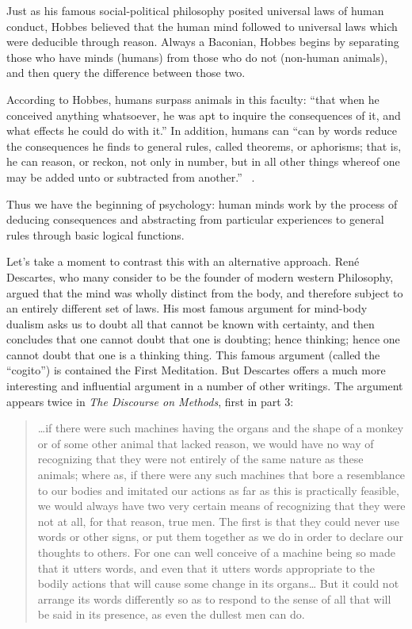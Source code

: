 \begin{refsection}
Just as his famous social-political philosophy posited universal laws of human conduct, Hobbes believed that the human mind followed to universal laws which were deducible through reason. Always a Baconian, Hobbes begins by separating those who have minds (humans) from those who do not (non-human animals), and then query the difference between those two.

According to Hobbes, humans surpass animals in this faculty: “that when he conceived anything whatsoever, he was apt to inquire the consequences of it, and what effects he could do with it.” In addition, humans can “can by words reduce the consequences he finds to general rules, called theorems, or aphorisms; that is, he can reason, or reckon, not only in number, but in all other things whereof one may be added unto or subtracted from another.” ~\citep[Ch V, \S 6]{Hobbes:1651wh}. 

Thus we have the beginning of psychology: human minds work by the process of deducing consequences and abstracting from particular experiences to general rules through basic logical functions. 

Let’s take a moment to contrast this with an alternative approach. René Descartes, who many consider to be the founder of modern western Philosophy, argued that the mind was wholly distinct from the body, and therefore subject to an entirely different set of laws. His most famous argument for mind-body dualism asks us to doubt all that cannot be known with certainty, and then concludes that one cannot doubt that one is doubting; hence thinking; hence one cannot doubt that one is a thinking thing. This famous argument (called the “cogito”) is contained the First Meditation. But Descartes offers a much more interesting and influential argument in a number of other writings. The argument appears twice in \emph{The Discourse on Methods}, first in part 3:

\begin{quote}

{\ldots}if there were such machines having the organs and the shape of a monkey or of some other animal that lacked reason, we would have no way of recognizing that they were not entirely of the same nature as these animals; where as, if there were any such machines that bore a resemblance to our bodies and imitated our actions as far as this is practically feasible, we would always have two very certain means of recognizing that they were not at all, for that reason, true men. The first is that they could never use words or other signs, or put them together as we do in order to declare our thoughts to others. For one can well conceive of a machine being so made that it utters words, and even that it utters words appropriate to the bodily actions that will cause some change in its organs{\ldots} But it could not arrange its words differently so as to respond to the sense of all that will be said in its presence, as even the dullest men can do. ~\citep[Ch 3, 1637]{Descartes:1968uf}
\end{quote}


\end{refsection}
